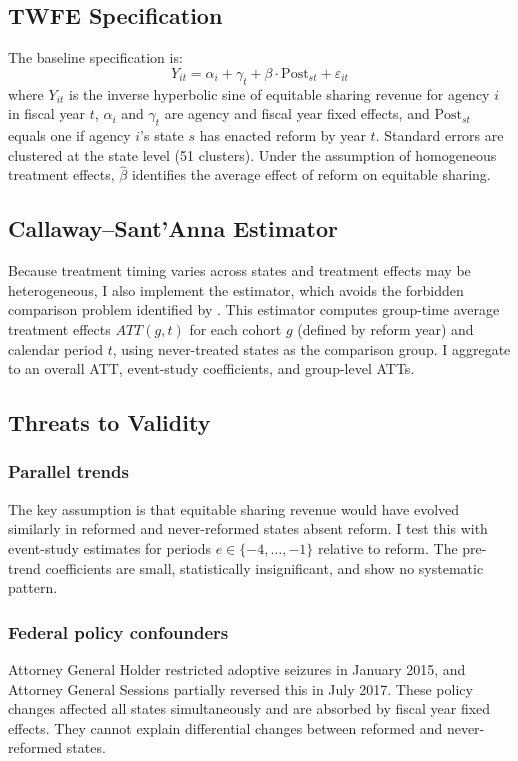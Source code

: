 \documentclass[12pt]{article}
\begin{document}
\subsection{TWFE Specification}

The baseline specification is:
\begin{equation}
  Y_{it} = \alpha_i + \gamma_t + \beta \cdot \text{Post}_{st} + \varepsilon_{it}
\end{equation}
where $Y_{it}$ is the inverse hyperbolic sine of equitable sharing revenue for agency $i$ in fiscal year $t$, $\alpha_i$ and $\gamma_t$ are agency and fiscal year fixed effects, and $\text{Post}_{st}$ equals one if agency $i$'s state $s$ has enacted reform by year $t$. Standard errors are clustered at the state level (51 clusters). Under the assumption of homogeneous treatment effects, $\hat{\beta}$ identifies the average effect of reform on equitable sharing.

\subsection{Callaway--Sant'Anna Estimator}

Because treatment timing varies across states and treatment effects may be heterogeneous, I also implement the \citet{callaway2021difference} estimator, which avoids the forbidden comparison problem identified by \citet{goodmanbacon2021difference}. This estimator computes group-time average treatment effects $ATT(g,t)$ for each cohort $g$ (defined by reform year) and calendar period $t$, using never-treated states as the comparison group. I aggregate to an overall ATT, event-study coefficients, and group-level ATTs.

\subsection{Threats to Validity}

\subsubsection*{Parallel trends} The key assumption is that equitable sharing revenue would have evolved similarly in reformed and never-reformed states absent reform. I test this with event-study estimates for periods $e \in \{-4, \ldots, -1\}$ relative to reform. The pre-trend coefficients are small, statistically insignificant, and show no systematic pattern.

\subsubsection*{Federal policy confounders} Attorney General Holder restricted adoptive seizures in January 2015, and Attorney General Sessions partially reversed this in July 2017. These policy changes affected all states simultaneously and are absorbed by fiscal year fixed effects. They cannot explain differential changes between reformed and never-reformed states.
\end{document}
